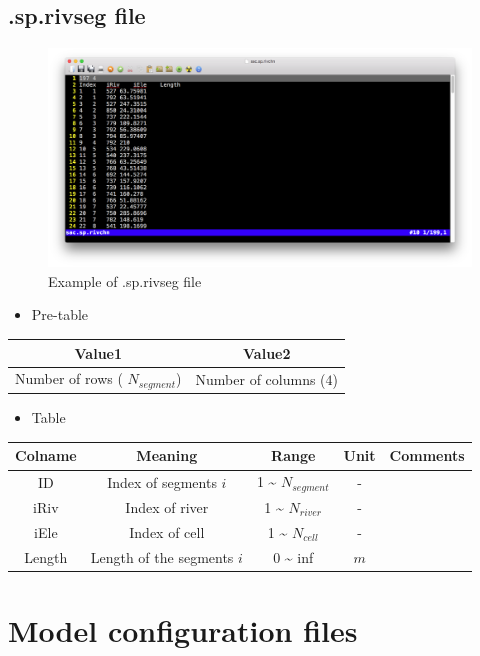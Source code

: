 \documentclass[]{scrbook}
\providecommand{\tightlist}{%
  \setlength{\itemsep}{0pt}\setlength{\parskip}{0pt}}
\begin{document}
\subsection{.sp.rivseg file}\label{sp.rivseg-file}

\begin{figure}
\centering
\includegraphics{Fig/IO/sp.rivchn.png}
\caption{Example of .sp.rivseg file}
\end{figure}

\begin{itemize}
\tightlist
\item
  Pre-table
\end{itemize}

\begin{longtable}[]{@{}cc@{}}
\toprule
Value1 & Value2\tabularnewline
\midrule
\endhead
Number of rows ( \(N_{segment}\)) & Number of columns
(\(4\))\tabularnewline
\bottomrule
\end{longtable}

\begin{itemize}
\tightlist
\item
  Table
\end{itemize}

\begin{longtable}[]{@{}ccccc@{}}
\toprule
Colname & Meaning & Range & Unit & Comments\tabularnewline
\midrule
\endhead
ID & Index of segments \(i\) & 1 \textasciitilde{} \(N_{segment}\) & -
&\tabularnewline
iRiv & Index of river & 1 \textasciitilde{} \(N_{river}\) & -
&\tabularnewline
iEle & Index of cell & 1 \textasciitilde{} \(N_{cell}\) & -
&\tabularnewline
Length & Length of the segments \(i\) & 0 \textasciitilde{} inf & \(m\)
&\tabularnewline
\bottomrule
\end{longtable}

\section{Model configuration files}\label{model-configuration-files}
\end{document}

